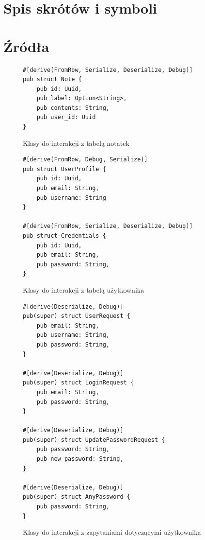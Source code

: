\documentclass[a4paper,twoside,12pt]{book}
\begin{document}
\begin{appendices}

\chapter{Spis skrótów i symboli}



\chapter{Źródła}

\begin{figure}[H]
\centering
\begin{lstlisting}
#[derive(FromRow, Serialize, Deserialize, Debug)]
pub struct Note {
    pub id: Uuid,
    pub label: Option<String>,
    pub contents: String,
    pub user_id: Uuid
}
\end{lstlisting}
\caption{Klasy do interakcji z tabelą notatek}
\label{fig:pseudokod:klasa-note}
\end{figure}

\begin{figure}[H]
\centering
\begin{lstlisting}
#[derive(FromRow, Debug, Serialize)]
pub struct UserProfile {
    pub id: Uuid,
    pub email: String,
    pub username: String
}

#[derive(FromRow, Serialize, Deserialize, Debug)]
pub struct Credentials {
    pub id: Uuid,
    pub email: String,
    pub password: String,
}
\end{lstlisting}
\caption{Klasy do interakcji z tabelą użytkownika}
\label{fig:pseudokod:klasa-user}
\end{figure}

\begin{figure}[H]
\centering
\begin{lstlisting}
#[derive(Deserialize, Debug)]
pub(super) struct UserRequest {
    pub email: String,
    pub username: String,
    pub password: String,
}

#[derive(Deserialize, Debug)]
pub(super) struct LoginRequest {
    pub email: String,
    pub password: String,
}

#[derive(Deserialize, Debug)]
pub(super) struct UpdatePasswordRequest {
    pub password: String,
    pub new_password: String,
}

#[derive(Deserialize, Debug)]
pub(super) struct AnyPassword {
    pub password: String,
}
\end{lstlisting}
\caption{Klasy do interakcji z zapytaniami dotyczącymi użytkownika}
\label{fig:pseudokod:klasa-interact-user}
\end{figure}


\end{appendices}
\end{document}
